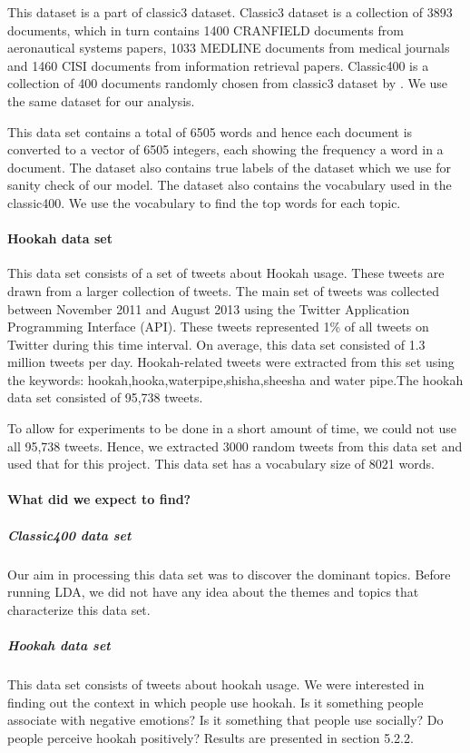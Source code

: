 \documentclass[11pt,a4paper,oneside]{article}
\begin{document}
This dataset is a part of classic3\cite{banerjee2005clustering} dataset. Classic3 dataset is a collection of 3893 documents, which in turn contains 1400 CRANFIELD documents from aeronautical systems papers, 1033 MEDLINE documents from medical journals and 1460 CISI documents from information retrieval papers. Classic400 is a collection of 400 documents randomly chosen from classic3 dataset by \cite{banerjee2005clustering}. We use the same dataset for our analysis.

This data set contains a total of 6505 words and hence each document is converted to a vector of 6505 integers, each showing the frequency a word in a document. The dataset also contains true labels of the dataset which we use for sanity check of our model. The dataset also contains the vocabulary used in the classic400. We use the vocabulary to find the top words for each topic.

\paragraph{Hookah data set}
This data set consists of a set of tweets about Hookah usage. These tweets are drawn from a larger collection of tweets. The main set of tweets was collected between November 2011 and August 2013 using the Twitter Application Programming Interface (API). These tweets represented 1\% of all tweets on Twitter during this time interval. On average, this data set consisted of 1.3 million tweets per day. Hookah-related tweets were extracted from this set using the keywords: hookah,hooka,waterpipe,shisha,sheesha and water pipe.The hookah data set consisted of 95,738 tweets. 

To allow for experiments to be done in a short amount of time, we could not use all 95,738 tweets. Hence, we extracted 3000 random tweets from this data set and used that for this project. This data set has a vocabulary size of 8021 words.

\paragraph{What did we expect to find?}
\subparagraph{Classic400 data set}
Our aim in processing this data set was to discover the dominant topics. Before running LDA, we did not have any idea about the themes and topics that characterize this data set. 

\subparagraph{Hookah data set}
This data set consists of tweets about hookah usage. We were interested in finding out the context in which people use hookah. Is it something people associate with negative emotions? Is it something that people use socially? Do people perceive hookah positively? Results are presented in section 5.2.2.
\end{document}
